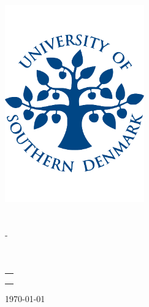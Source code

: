 
\begin{titlepage}
	\begin{center}
	\includegraphics[width=60mm,keepaspectratio]{figures/sdu_logo}\\
	\vspace{0.3cm}
	\textbf{\institute}\\
	\textmd{\department}\\
	\textmd{\program} - \textmd{\course}\\[4cm]

	\vspace{0.4cm}
	{\huge \bfseries \documentTitle}
	\\
	\vspace{0.5cm}
	{\large \documentType}
	\\[2cm]

	\begin{tabular}{c}
	 \makebox[4cm]{\emph{Authors}} \\
	 \makebox[4cm]{\authorOne} \\
	 \makebox[4cm]{\authorTwo} \\
	\end{tabular}

	\vfill
	{\large \today}
	\end{center}
\end{titlepage}
